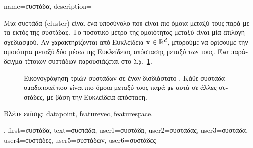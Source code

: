 {name={\foreignlanguage{greek}{συστάδα}}, 
	description={\foreignlanguage{greek}{Μία συστάδα} (cluster) \foreignlanguage{greek}{είναι ένα υποσύνολο}
		 \foreignlanguage{greek}{που είναι πιο όμοια μεταξύ τους παρά με τα}  
		\foreignlanguage{greek}{εκτός της συστάδας. Το ποσοτικό μέτρο της ομοιότητας μεταξύ} 
		 \foreignlanguage{greek}{είναι μία επιλογή σχεδιασμού. Αν}  
		\foreignlanguage{greek}{χαρακτηρίζονται από Ευκλείδεια}  ${\bf x} \in \mathbb{R}^{d}$, 
		\foreignlanguage{greek}{μπορούμε να ορίσουμε την ομοιότητα μεταξύ δύο}  \foreignlanguage{greek}{μέσω της 
		Ευκλείδειας απόστασης μεταξύ των}  \foreignlanguage{greek}{τους. Ένα παράδειγμα τέτοιων συστάδων 
		παρουσιάζεται στο Σχ.}~\ref{fig:clusters}.\\
		\begin{figure}[H]
		\centering
		{
		\caption{\foreignlanguage{greek}{Εικονογράφηση τριών συστάδων σε έναν δισδιάστατο} . \foreignlanguage{greek}{Κάθε 
		συστάδα ομαδοποιεί}  \foreignlanguage{greek}{που είναι πιο όμοια μεταξύ τους παρά με αυτά σε άλλες συστάδες, με βάση την 
		Ευκλείδεια απόσταση.} }
		\label{fig:clusters} }
		\end{figure}
		\foreignlanguage{greek}{Βλέπε επίσης:} \gls{datapoint}, \gls{featurevec}, \gls{featurespace}.
		},
		first={\foreignlanguage{greek}{συστάδα}},
		text={\foreignlanguage{greek}{συστάδα}},
		user1={\foreignlanguage{greek}{συστάδα}}, %
		user2={\foreignlanguage{greek}{συστάδας}}, %
		user3={\foreignlanguage{greek}{συστάδα}}, %
		user4={\foreignlanguage{greek}{συστάδες}}, %
		user5={\foreignlanguage{greek}{συστάδων}}, %
		user6={\foreignlanguage{greek}{συστάδες}} %
}

